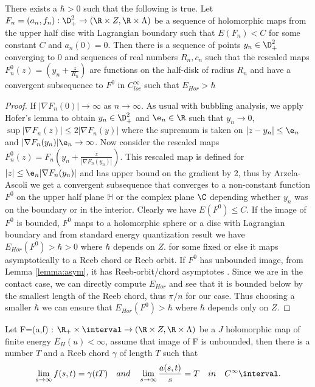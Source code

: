 \begin{lemma}[Bubbling]\label{lemma:bubbling}
There exists a $\hbar>0$ such that the following is true. Let $F_n =(a_n,f_n):\D_+^2 \to (\R \times  Z, \R \times \Lambda)$ be a sequence of holomorphic maps from the upper half disc with Lagrangian boundary such that $E(F_n) < C$ for some constant $C$ and $a_n(0) = 0 $. Then there is a sequence of points $y_n \in \D^2_+$ converging to 0 and  sequences of real numbers $R_n,c_n$ such that the rescaled maps $F^0_n(z)=(y_n + \frac{z}{R_n})$ are functions on the half-disk of radius $R_n$ and have a convergent subsequence to $F^0$ in $C^\infty_{loc}$ such that $E_{Hor}>\hbar$
\end{lemma} 

\begin{proof}
If $|\nabla F_n(0)| \to \infty$ as $n \to \infty$.  As usual with bubbling analysis, we apply Hofer's lemma to obtain $y_n \in \D^2_+ $ and $\e_n \in \R$ such that $y_n\to 0$, $\sup |\nabla F_n (z) | \leq 2 | \nabla F_n(y) | $ where the supremum is taken on $|z-y_n| \leq \e_n$ and $|\nabla F_n(y_n)|\e_n \to \infty$. Now consider the rescaled maps $F^0_n(z) = F_n(y_n + \frac{z}{|\nabla F_n(y_n)|})$. This rescaled map is defined for $|z| \leq \e_n|\nabla F_n(y_n)|$ and has upper bound on the gradient by 2, thus by Arzela-Ascoli we get a convergent subsequence that converges to a non-constant function $F^0$ on the upper half plane $\mathbb{H}$ or the complex plane $\C$ depending whether $y_n$ was on the boundary or in the interior. Clearly we have $E(F^0) \leq C$. If the image of $F^0$ is bounded, $F^0$  maps to a holomorphic sphere or a disc with Lagrangian boundary and from standard energy quantization result we have $E_{Hor}(F^0) > \hbar > 0$ where $\hbar$ depends on $Z$. for some fixed  or else it maps asymptotically to a Reeb chord or Reeb orbit. If $F^0$ has unbounded image, from Lemma \ref{lemma:asym},  it has Reeb-orbit/chord asymptotes . Since we are in the contact case, we can directly compute $E_{Hor}$ and see that it is bounded below by the smallest length of the Reeb chord, thus $\pi/n$ for our case. Thus choosing a smaller $\hbar$ we can ensure that $E_{Hor}(F^0) > \hbar$ where $\hbar$ depends only on $Z$.
\end{proof}

 
\begin{lemma}\label{lemma:asym}
Let F=(a,f) : $\R_+ \times \interval \to (\R \times Z, \R \times \Lambda)$ be a $J$ holomorphic map of finite energy $E_H(u)< \infty$, assume that image of F is unbounded, then there is a number $T$ and a Reeb chord $\gamma$  of length $T$ such that $$\lim_{s\to \infty } f(s,t) = \gamma (tT) \quad and \quad \lim_{s\to\infty} \frac{a(s,t)}{s} = T \quad in \quad C^{\infty}\interval.$$
\end{lemma}

